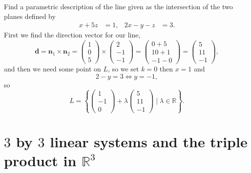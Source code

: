 \begin{example}
    Find a parametric description of the line given as the intersection of the two planes defined by
    \begin{align*}
        x+5z&=1,&2x-y-z&=3.
    \end{align*}
    First we find the direction vector for our line,
    \[
        \bm d=\bm n_1\times\bm n_2=
        \begin{pmatrix}
            1\\0\\5
        \end{pmatrix}
        \times
        \begin{pmatrix}
            2\\-1\\-1
        \end{pmatrix}
        =
        \begin{pmatrix}
            0+5\\10+1\\-1-0
        \end{pmatrix}
        =\begin{pmatrix}
            5\\11\\-1
        \end{pmatrix}
        ,
    \]
    and then we need some point on $L$, so we set $k=0$ then $x=1$ and
    \[2-y=3\iff y=-1,\]
    so
    \[
        L=
        \left\{
            \begin{pmatrix}
                1\\-1\\0
            \end{pmatrix}
            +\lambda
            \begin{pmatrix}
                5\\11\\-1
            \end{pmatrix}
            \mid\lambda\in\mathbb R
        \right\}.
    \]
\end{example}

\section{$3$ by $3$ linear systems and the triple product in $\mathbb R^3$}

